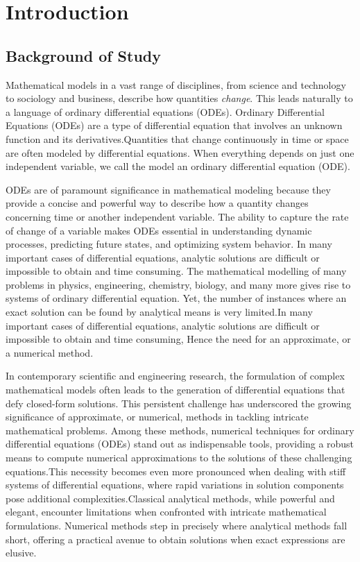 \setlength{\headheight}{14.49998pt}
\addtolength{\topmargin}{-2.49998pt}

\chapter{Introduction}



\section{Background of Study}
Mathematical models in a vast range of disciplines, from science and technology to sociology and business, describe how quantities \textsl{change}. This leads naturally to a language of ordinary differential equations (ODEs).
Ordinary Differential Equations (ODEs) are a type of differential equation that involves an unknown function and its derivatives.Quantities that change continuously in time or space are often modeled by differential equations. When everything depends on just one independent variable, we call the model an ordinary differential equation (ODE)\cite{fnc_multistep_methods}.

ODEs are of paramount significance in mathematical modeling because they provide a concise and powerful way to describe how a quantity changes concerning time or another independent variable. The ability to capture the rate of change of a variable makes ODEs essential in understanding dynamic processes, predicting future states, and optimizing system behavior.
In many important cases of differential equations, analytic solutions are difficult or impossible to obtain and time
consuming.
The mathematical modelling of many problems in physics, engineering, chemistry, biology, and many more gives rise to systems of ordinary differential equation. Yet, the number of instances where an exact solution can be found by analytical means is very limited\cite{lambert1977}.In many important cases of differential equations, analytic solutions are difficult or impossible to obtain and time
consuming, Hence the need for an approximate, or a numerical method.

In contemporary scientific and engineering research, the formulation of complex mathematical models often leads to the generation of differential equations that defy closed-form solutions. This persistent challenge has underscored the growing significance of approximate, or numerical, methods in tackling intricate mathematical problems. Among these methods, numerical techniques for ordinary differential equations (ODEs) stand out as indispensable tools, providing a robust means to compute numerical approximations to the solutions of these challenging equations.This necessity becomes even more pronounced when dealing with stiff systems of differential equations, where rapid variations in solution components pose additional complexities.Classical analytical methods, while powerful and elegant, encounter limitations when confronted with intricate mathematical formulations. Numerical methods step in precisely where analytical methods fall short, offering a practical avenue to obtain solutions when exact expressions are elusive.

